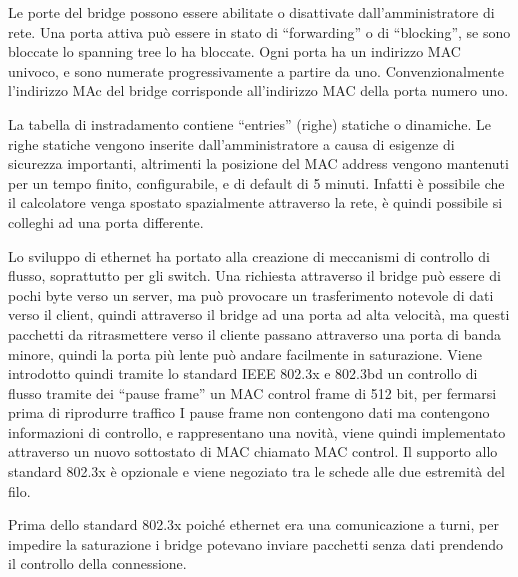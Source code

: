 \documentclass{article}
\numberwithin{equation}{subsection}
\begin{document}
Le porte del bridge possono essere abilitate o disattivate dall'amministratore di rete. Una porta attiva può essere in stato di ``forwarding'' o di ``blocking'', se sono 
bloccate lo spanning tree lo ha bloccate. Ogni porta ha un indirizzo MAC univoco, e sono numerate progressivamente a partire da uno. Convenzionalmente l'indirizzo MAc 
del bridge corrisponde all'indirizzo MAC della porta numero uno. 

La tabella di instradamento contiene ``entries'' (righe) statiche o dinamiche. Le righe statiche vengono inserite dall'amministratore a causa di esigenze di sicurezza 
importanti, altrimenti la posizione del MAC address vengono mantenuti per un tempo finito, configurabile, e di default di 5 minuti. Infatti è possibile che il calcolatore 
venga spostato spazialmente attraverso la rete, è quindi possibile si colleghi ad una porta differente. 


Lo sviluppo di ethernet ha portato alla creazione di meccanismi di controllo di flusso, soprattutto per gli switch. Una richiesta attraverso il bridge può essere di 
pochi byte verso un server, ma può provocare un trasferimento notevole di dati verso il client, quindi attraverso il bridge ad una porta ad alta velocità, ma questi 
pacchetti da ritrasmettere verso il cliente passano attraverso una porta di banda minore, quindi la porta più lente può andare facilmente in saturazione. 
Viene introdotto quindi tramite lo standard IEEE 802.3x e 802.3bd un controllo di flusso tramite dei ``pause frame'' un MAC control frame di 512 bit, per fermarsi 
prima di riprodurre traffico I pause frame non contengono dati ma contengono informazioni di controllo, e rappresentano una novità, viene quindi implementato 
attraverso un nuovo sottostato di MAC chiamato MAC control. Il supporto allo standard 802.3x è opzionale e viene negoziato tra le schede alle due estremità del filo. 

Prima dello standard 802.3x poiché ethernet era una comunicazione a turni, per impedire la saturazione i bridge potevano inviare pacchetti senza dati prendendo il 
controllo della connessione. 
\end{document}
